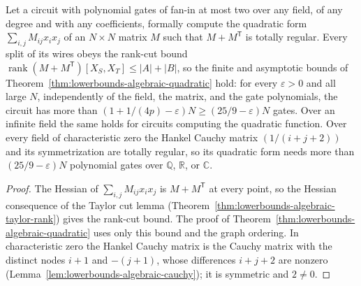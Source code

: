 \begin{theorem}
  \label{thm:lowerbounds-algebraic-quadratic-polynomial}
  \leanok
  Let a circuit with polynomial gates of fan-in at most two over any field,
  of any degree and with any coefficients, formally compute the quadratic
  form $\sum_{i,j}M_{ij}x_ix_j$ of an $N\times N$ matrix $M$ such that
  $M+M^{\mathsf T}$ is totally regular. Every split of its wires obeys the
  rank-cut bound $\operatorname{rank}(M+M^{\mathsf T})[X_S,X_T]\le|A|+|B|$, so
  the finite and asymptotic bounds of
  Theorem~\ref{thm:lowerbounds-algebraic-quadratic} hold: for every
  $\varepsilon>0$ and all large $N$, independently of the field, the matrix,
  and the gate polynomials, the circuit has more than
  $(1+1/(4p)-\varepsilon)N\ge(25/9-\varepsilon)N$ gates. Over an infinite
  field the same holds for circuits computing the quadratic function. Over
  every field of characteristic zero the Hankel Cauchy matrix
  $(1/(i+j+2))$ and its symmetrization are totally regular, so its quadratic
  form needs more than $(25/9-\varepsilon)N$ polynomial gates over
  $\mathbb{Q}$, $\mathbb{R}$, or $\mathbb{C}$.
\end{theorem}
\begin{proof}
  \leanok
  The Hessian of $\sum_{i,j}M_{ij}x_ix_j$ is $M+M^{\mathsf T}$ at every point,
  so the Hessian consequence of the Taylor cut lemma
  (Theorem~\ref{thm:lowerbounds-algebraic-taylor-rank}) gives the rank-cut
  bound. The proof of Theorem~\ref{thm:lowerbounds-algebraic-quadratic} uses
  only this bound and the graph ordering. In characteristic zero the Hankel
  Cauchy matrix is the Cauchy matrix with the distinct nodes $i+1$ and
  $-(j+1)$, whose differences $i+j+2$ are nonzero
  (Lemma~\ref{lem:lowerbounds-algebraic-cauchy}); it is symmetric and
  $2\ne0$.
\end{proof}

